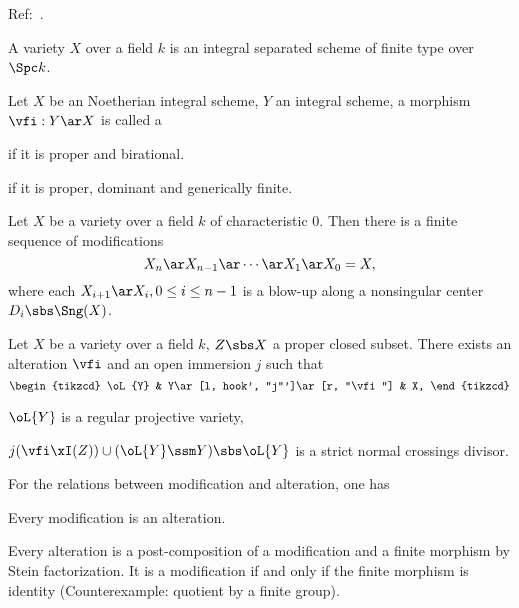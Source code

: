 \documentclass[article, a4paper, twoside]{universal}
\begin{document}
\confighead{}{}{}

Ref:~\cite{Hironaka1964,deJong1996}.


\begin{stp}
	A variety $X$ over a field $k$ is an integral separated scheme of finite type over $\Spc k$.
\end{stp}

\begin{dfn}
	Let $X$ be an Noetherian integral scheme, $Y$ an integral scheme, a morphism $\vfi:Y\ar X$ is called a
	\begin{enr}
		\item \cite[2.17]{deJong1996}  if it is proper and birational.
		\item \cite[2.20]{deJong1996}  if it is proper, dominant and generically finite.
	\end{enr}
\end{dfn}


\begin{thm}
	Let $X$ be a variety over a field $k$ of characteristic $0$. Then there is a finite sequence of modifications
	\[
		X_{n}\ar X_{n-1}\ar\cdots\ar X_{1}\ar X_{0}=X,
	\]
	where each $X_{i+1}\ar X_{i}, 0\leq i\leq n-1$ is a blow-up along a nonsingular center $D_{i}\sbs\Sng(X)$.
\end{thm}


\begin{thm}
	Let $X$ be a variety over a field $k$, $Z\sbs X$ a proper closed subset. There exists an alteration $\vfi$ and an open immersion $j$ such that
	\[
		\begin{tikzcd}
			\oL{Y} & Y\ar[l, hook', "j"']\ar[r, "\vfi"] & X,
		\end{tikzcd}
	\]
	\begin{enr}
		\item $\oL{Y}$ is a regular projective variety,
		\item $j(\vfi\xI(Z))\cup(\oL{Y}\ssm Y)\sbs \oL{Y}$ is a strict normal crossings divisor.
	\end{enr}
\end{thm}


\begin{rmk}
	For the relations between modification and alteration, one has
	\begin{itm}
		\item Every modification is an alteration.
		\item Every alteration is a post-composition of a modification and a finite morphism by Stein factorization. It is a modification if and only if the finite morphism is identity (Counterexample: quotient by a finite group).
	\end{itm}
\end{rmk}



\printref
\end{document}
